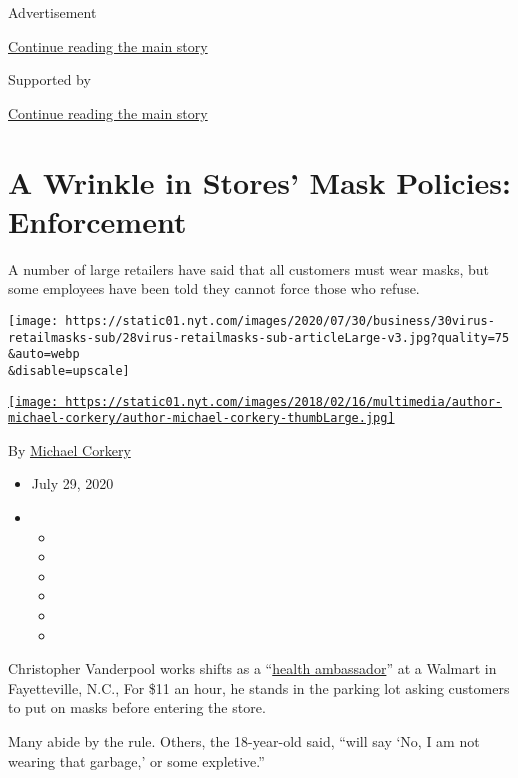 Advertisement

\protect\hyperlink{after-top}{Continue reading the main story}

Supported by

\protect\hyperlink{after-sponsor}{Continue reading the main story}

\hypertarget{a-wrinkle-in-stores-mask-policies-enforcement}{%
\section{A Wrinkle in Stores' Mask Policies:
Enforcement}\label{a-wrinkle-in-stores-mask-policies-enforcement}}

A number of large retailers have said that all customers must wear
masks, but some employees have been told they cannot force those who
refuse.

\texttt{[image: https://static01.nyt.com/images/2020/07/30/business/30virus-retailmasks-sub/28virus-retailmasks-sub-articleLarge-v3.jpg?quality=75\\\&auto=webp\\\&disable=upscale]}

\href{https://www.nytimes.com/by/michael-corkery}{\texttt{[image: https://static01.nyt.com/images/2018/02/16/multimedia/author-michael-corkery/author-michael-corkery-thumbLarge.jpg]}}

By \href{https://www.nytimes.com/by/michael-corkery}{Michael Corkery}

\begin{itemize}
\item
  July 29, 2020
\item
  \begin{itemize}
  \item
  \item
  \item
  \item
  \item
  \item
  \end{itemize}
\end{itemize}

Christopher Vanderpool works shifts as a
``\href{https://www.nytimes.com/2020/07/15/business/walmart-requiring-masks.html?searchResultPosition=1}{health
ambassador}'' at a Walmart in Fayetteville, N.C., For \$11 an hour, he
stands in the parking lot asking customers to put on masks before
entering the store.

Many abide by the rule. Others, the 18-year-old said, ``will say `No, I
am not wearing that garbage,' or some expletive.''

